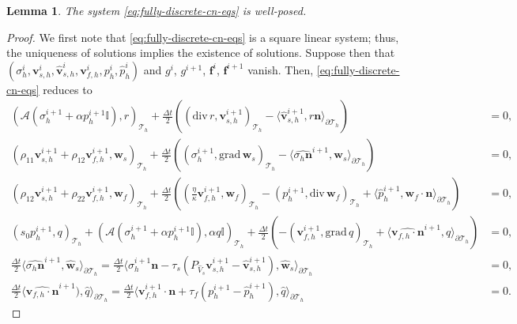 \documentclass[10pt,a4paper]{amsart}
\newtheorem{lemma}{Lemma}
\newcommand{\Ael}{\mathcal{A}} %
\newcommand{\Id}{\mathbb{I}} %
\newcommand{\Thprod}[2]{( #1, #2 )_{\mathcal{T}_h}}
\newcommand{\divergence}{\mathrm{div}\,}
\newcommand{\grad}{\mathrm{grad}\,}
\newcommand{\pThprod}[2]{\langle #1, #2 \rangle_{\partial \mathcal{T}_{h}}}
\newcommand{\vect}[1]{\mathbf{#1}}
\begin{document}
\begin{lemma}
	The system \eqref{eq:fully-discrete-cn-eqs} is well-posed.
\end{lemma}

\begin{proof}
	We first note that \eqref{eq:fully-discrete-cn-eqs} is a square linear system; thus, the uniqueness of solutions implies the existence of solutions. 
	Suppose then that $(\sigma_h^i, \vect{v}_{s,h}^i, \widehat{\vect{v}}_{s,h}^i, \vect{v}_{f,h}^i, p_h^i, \widehat{p}_h^i)$ and $g^i$, $g^{i+1}$, $\vect{f}^{i}$, $\vect{f}^{i+1}$ vanish. Then, \eqref{eq:fully-discrete-cn-eqs} reduces to 
		\begin{align*}
			\Thprod{\Ael(\sigma_{h}^{i+1} + \alpha {p}_{h}^{i+1} \Id)}{r} +\frac{\Delta t}{2} (\Thprod{\divergence r}{\vect{v}_{s,h}^{i+1}} -\pThprod{\widehat{\vect{v}}_{s,h}^{i+1}}{r \vect{n}})& = 0 ,
			\\ 
			\Thprod{\rho_{11}{\vect{v}}_{s,h}^{i+1} +\rho_{12}{\vect{v}}_{f,h}^{i+1}}{\vect{w}_{s}} + \frac{\Delta t}{2}\left(\Thprod{\sigma_{h}^{i+1}}{\grad \vect{w}_{s}} 
			- \pThprod{\widehat{\sigma_{h} \vect{n}}^{i+1} }{\vect{w}_{s}}\right)& = 0, 
			\\
			\Thprod{\rho_{12}{\vect{v}}_{s,h}^{i+1}+\rho_{22}{\vect{v}}_{f,h}^{i+1}}{\vect{w}_{f}} + \frac{\Delta t}{2}\left(\Thprod{\frac{\eta}{\kappa} \vect{v}_{f,h}^{i+1}}{\vect{w}_{f}} 
			- \Thprod{p_{h}^{i+1} }{\divergence\vect{w}_{f}} +\pThprod{\widehat{p}_{h}^{i+1}}{\vect{w}_{f}\cdot\vect{n}}\right) &= 0, 
			\\
			\Thprod{s_{0}{p}_{h}^{i+1}}{q} + \Thprod{\Ael({\sigma}_{h}^{i+1}+\alpha {p}_{h}^{i+1}\Id)}{\alpha q\Id} + \frac{\Delta t}{2} \left(-\Thprod{\vect{v}_{f,h}^{i+1}}{\grad q} 
			+ \pThprod{\widehat{\vect{v}_{f,h}\cdot \vect{n}}^{i+1}}{q}\right) &= 0,
			\\
			\frac{\Delta t}{2}\pThprod{\widehat{\sigma_h \vect{n}}^{i+1} }{\widehat{\vect{w}}_{s}}=
			\frac{\Delta t}{2}\pThprod{\sigma_h^{i+1} \vect{n} - \tau_{s} (P_{\widehat{V}_s} \vect{v}_{s,h}^{i+1} - \widehat{\vect{v}}_{s,h}^{i+1})}{\widehat{\vect{w}}_{s}} &= 0, 
			\\
			\frac{\Delta t}{2}\pThprod{\widehat{\vect{v}_{f,h}\cdot \vect{n}}^{i+1})}{\widehat{q}}=
			\frac{\Delta t}{2}\pThprod{\vect{v}_{f,h}^{i+1}\cdot \vect{n} + \tau_f (p_h^{i+1} - \widehat{p}_h^{i+1})}{\widehat{q}} &= 0 .
		\end{align*}

\end{proof}
\end{document}
